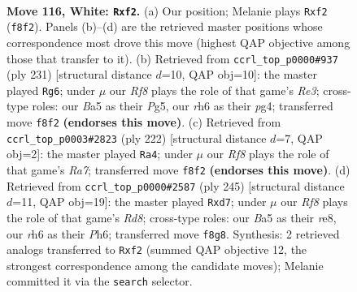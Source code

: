\documentclass[11pt]{article}
\begin{document}
\clearpage

\begin{figure}[p]\centering
\begin{subfigure}{0.46\textwidth}\centering
\resizebox{\linewidth}{!}{%
\newchessgame
\chessboard[
  setfen={5R2/7k/7r/B7/8/8/K4p2/8 w - - 2 116},
  showmover=false,
  pgfstyle=straightmove, color=movearrow, markmove={f8-f2}
]}
\caption{}
\end{subfigure}\hfill
\begin{subfigure}{0.46\textwidth}\centering
\resizebox{\linewidth}{!}{%
\newchessgame
\chessboard[
  setfen={3R4/6k1/4r3/6p1/6P1/3KP3/8/8 b - - 98 116},
  showmover=false,
  pgfstyle=straightmove, color=movearrow, markmove={e6-g6}
]}
\caption{}
\end{subfigure}
\\[4pt]
\begin{subfigure}{0.46\textwidth}\centering
\resizebox{\linewidth}{!}{%
\newchessgame
\chessboard[
  setfen={2r2k2/R7/4p3/8/8/3K2B1/8/8 w - - 19 112},
  showmover=false,
  pgfstyle=straightmove, color=movearrow, markmove={a7-a4}
]}
\caption{}
\end{subfigure}\hfill
\begin{subfigure}{0.46\textwidth}\centering
\resizebox{\linewidth}{!}{%
\newchessgame
\chessboard[
  setfen={4R3/3P4/2K4p/5k2/8/8/8/3r4 b - - 14 123},
  showmover=false,
  pgfstyle=straightmove, color=movearrow, markmove={d1-d7}
]}
\caption{}
\end{subfigure}
\caption{\textbf{Move 116, White: \texttt{Rxf2}.} (a) Our position; Melanie plays \texttt{Rxf2} (\texttt{f8f2}). Panels (b)--(d) are the retrieved master positions whose correspondence most drove this move (highest QAP objective among those that transfer to it). (b) Retrieved from \texttt{ccrl\_top\_p0000\#937} (ply 231) [structural distance $d$=10, QAP obj=10]: the master played \texttt{Rg6}; under $\mu$ our \emph{Rf8} plays the role of that game's \emph{Re3}; cross-type roles: our \emph{B}a5 as their \emph{P}g5, our \emph{r}h6 as their \emph{p}g4; transferred move \texttt{f8f2} \textbf{(endorses this move)}. (c) Retrieved from \texttt{ccrl\_top\_p0003\#2823} (ply 222) [structural distance $d$=7, QAP obj=2]: the master played \texttt{Ra4}; under $\mu$ our \emph{Rf8} plays the role of that game's \emph{Ra7}; transferred move \texttt{f8f2} \textbf{(endorses this move)}. (d) Retrieved from \texttt{ccrl\_top\_p0000\#2587} (ply 245) [structural distance $d$=11, QAP obj=19]: the master played \texttt{Rxd7}; under $\mu$ our \emph{Rf8} plays the role of that game's \emph{Rd8}; cross-type roles: our \emph{B}a5 as their \emph{r}e8, our \emph{r}h6 as their \emph{P}h6; transferred move \texttt{f8g8}. Synthesis: 2 retrieved analogs transferred to \texttt{Rxf2} (summed QAP objective 12, the strongest correspondence among the candidate moves); Melanie committed it via the \texttt{search} selector.}
\label{fig:thought-m230}
\end{figure}
\end{document}
